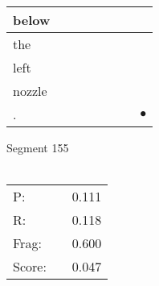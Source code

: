 \documentclass[landscape]{article}
\newcommand{\ssp}{\hspace{2pt}}
\newcommand{\mex}{\cellcolor{g}$\bullet$}
\begin{document}
\begin{tabular}{|l|p{10pt}|p{10pt}|p{10pt}|p{10pt}|p{10pt}|p{10pt}|p{10pt}|}
\hline
\ssp below \ssp&\hspace{2pt}&\hspace{2pt}&\hspace{2pt}&\hspace{2pt}&\hspace{2pt}&\hspace{2pt}&\hspace{2pt}\\
\hline
\ssp the \ssp&\hspace{2pt}&\hspace{2pt}&\hspace{2pt}&\hspace{2pt}&\hspace{2pt}&\hspace{2pt}&\hspace{2pt}\\
\hline
\ssp left \ssp&\hspace{2pt}&\hspace{2pt}&\hspace{2pt}&\hspace{2pt}&\hspace{2pt}&\hspace{2pt}&\hspace{2pt}\\
\hline
\ssp nozzle \ssp&\hspace{2pt}&\hspace{2pt}&\hspace{2pt}&\hspace{2pt}&\hspace{2pt}&\hspace{2pt}&\hspace{2pt}\\
\hline
\ssp \cellcolor{ref6}. \ssp&\hspace{2pt}&\hspace{2pt}&\hspace{2pt}&\hspace{2pt}&\hspace{2pt}&\hspace{2pt}&\hspace{2pt}\mex\\
\hline
\end{tabular}

\vspace{6pt}
\noindent Segment 155\\\\
\noindent\begin{tabular}{lm{12pt}r}
\hline
P:&&0.111\\
R:&&0.118\\
Frag:&&0.600\\
Score:&&0.047\\
\end{tabular}
\end{document}
